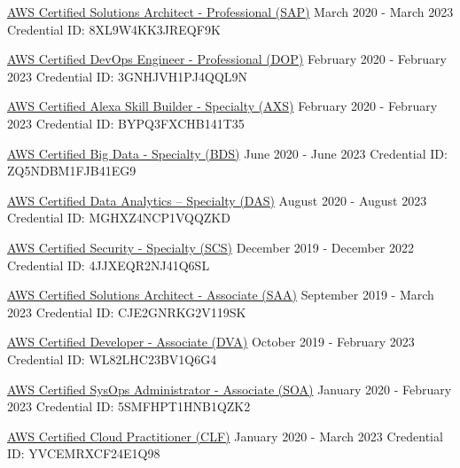 \documentclass[letterpaper]{awesome-cv}
\begin{document}
\begin{cventries}
  \cventry
    {
      \href{https://www.youracclaim.com/badges/03730776-b911-43ac-8d3a-99f3f4513162/public_url}{AWS Certified Solutions Architect - Professional (SAP)}
    }
    {March 2020 - March 2023}
    {Credential ID: 8XL9W4KK3JREQF9K}
    {}
    {}

  \cventry
    {
      \href{https://www.youracclaim.com/badges/d0c32f27-054b-432c-9fd1-8d3e912a9396/public_url}{AWS Certified DevOps Engineer - Professional (DOP)}
    }
    {February 2020 - February 2023}
    {Credential ID: 3GNHJVH1PJ4QQL9N}
    {}
    {}

  \cventry
    {
      \href{https://www.youracclaim.com/badges/b908a72e-7d86-41f1-9715-d8a035f07b70/public_url}{AWS Certified Alexa Skill Builder - Specialty (AXS)}
    }
    {February 2020 - February 2023}
    {Credential ID: BYPQ3FXCHB141T35}
    {}
    {}

  \cventry
    {
      \href{https://www.youracclaim.com/badges/8e12bd33-2fa9-4ea9-bc06-b6a34cba1ca1/public_url}{AWS Certified Big Data - Specialty (BDS)}
    }
    {June 2020 - June 2023}
    {Credential ID: ZQ5NDBM1FJB41EG9}
    {}
    {}

  \cventry
    {
      \href{https://www.youracclaim.com/badges/70174d02-8350-4f34-9d9d-26b3e8f3341d/public_url}{AWS Certified Data Analytics – Specialty (DAS)}
    }
    {August 2020 - August 2023}
    {Credential ID: MGHXZ4NCP1VQQZKD}
    {}
    {}

  \cventry
    {
      \href{https://www.youracclaim.com/badges/33206a04-66c4-41df-877b-db34ffcb93a8/public_url}{AWS Certified Security - Specialty (SCS)}
    }
    {December 2019 - December 2022}
    {Credential ID: 4JJXEQR2NJ41Q6SL}
    {}
    {}

  \cventry
    {
      \href{https://www.youracclaim.com/badges/b0cd52af-b58f-44ff-aa19-b189ce841629/public_url}{AWS Certified Solutions Architect - Associate (SAA)}
    }
    {September 2019 - March 2023}
    {Credential ID: CJE2GNRKG2V119SK}
    {}
    {}

  \cventry
    {
      \href{https://www.youracclaim.com/badges/afffcfaa-b3d0-4d2b-8d3e-71c281150763/public_url}{AWS Certified Developer - Associate (DVA)}
    }
    {October 2019 - February 2023}
    {Credential ID: WL82LHC23BV1Q6G4}
    {}
    {}

  \cventry
    {
      \href{https://www.youracclaim.com/badges/b3409740-de23-4249-939b-81abe72624cb/public_url}{AWS Certified SysOps Administrator - Associate (SOA)}
    }
    {January 2020 - February 2023}
    {Credential ID: 5SMFHPT1HNB1QZK2}
    {}
    {}

  \cventry
    {
      \href{https://www.youracclaim.com/badges/d8fc811b-6cda-46d0-a1b1-1aee5e390dd1/public_url}{AWS Certified Cloud Practitioner (CLF)}
    }
    {January 2020 - March 2023}
    {Credential ID: YVCEMRXCF24E1Q98}
    {}
    {}

\end{cventries}
\end{document}
